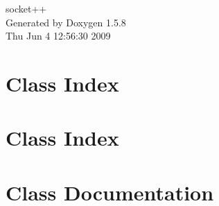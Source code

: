 \documentclass[a4paper]{book}
\begin{document}
\begin{titlepage}
\vspace*{7cm}
\begin{center}
{\Large socket++ }\\
\vspace*{1cm}
{\large Generated by Doxygen 1.5.8}\\
\vspace*{0.5cm}
{\small Thu Jun 4 12:56:30 2009}\\
\end{center}
\end{titlepage}
\clearemptydoublepage
{}
\tableofcontents
\clearemptydoublepage
{}
\chapter{Class Index}

\chapter{Class Index}

\chapter{Class Documentation}





















\printindex
\end{document}
